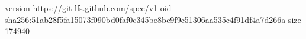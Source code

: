 version https://git-lfs.github.com/spec/v1
oid sha256:51ab28f5fa15073f090bd0faf0c345be8bc9f9c51306aa535c4f91df4a7d266a
size 174940
